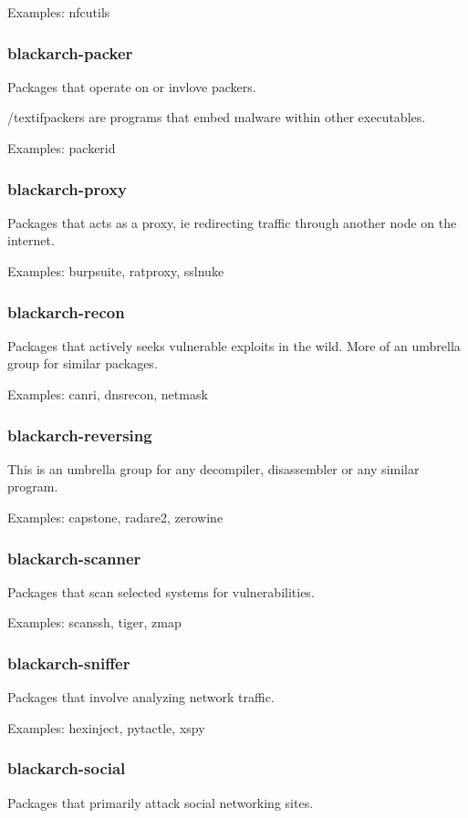 \documentclass[a4paper, oneside, 11pt]{book}
\begin{document}
Examples: nfcutils

\subsubsection{blackarch-packer}
Packages that operate on or invlove packers.

/textif{packers are programs that embed malware within other executables.}

Examples: packerid

\subsubsection{blackarch-proxy}
Packages that acts as a proxy, ie redirecting traffic
through another node on the internet.

Examples: burpsuite, ratproxy, sslnuke

\subsubsection{blackarch-recon}
Packages that actively seeks vulnerable exploits in the
wild. More of an umbrella group for similar packages.

Examples: canri, dnsrecon, netmask

\subsubsection{blackarch-reversing}
This is an umbrella group for any decompiler,
disassembler or any similar program.

Examples: capstone, radare2, zerowine

\subsubsection{blackarch-scanner}
Packages that scan selected systems for vulnerabilities.

Examples: scanssh, tiger, zmap

\subsubsection{blackarch-sniffer}
Packages that involve analyzing network traffic.

Examples: hexinject, pytactle, xspy

\subsubsection{blackarch-social}
Packages that primarily attack social networking sites.
\end{document}

